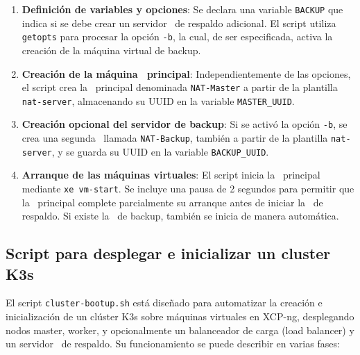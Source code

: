 \begin{enumerate}
    \item \textbf{Definición de variables y opciones}:  
    Se declara una variable \texttt{BACKUP} que indica si se debe crear un servidor \NAT\ de respaldo adicional. El script utiliza \texttt{getopts} para procesar la opción \texttt{-b}, la cual, de ser especificada, activa la creación de la máquina virtual de backup.

    \item \textbf{Creación de la máquina \NAT\ principal}:  
    Independientemente de las opciones, el script crea la \VM\ principal denominada \texttt{NAT-Master} a partir de la plantilla \texttt{nat-server}, almacenando su UUID en la variable \texttt{MASTER\_UUID}.

    \item \textbf{Creación opcional del servidor de backup}:  
    Si se activó la opción \texttt{-b}, se crea una segunda \VM\ llamada \texttt{NAT-Backup}, también a partir de la plantilla \texttt{nat-server}, y se guarda su UUID en la variable \texttt{BACKUP\_UUID}.

    \item \textbf{Arranque de las máquinas virtuales}:  
    El script inicia la \VM\ principal mediante \texttt{xe vm-start}. Se incluye una pausa de 2 segundos para permitir que la \VM\ principal complete parcialmente su arranque antes de iniciar la \VM\ de respaldo. Si existe la \VM\ de backup, también se inicia de manera automática.

\end{enumerate}



\subsection{Script para desplegar e inicializar un cluster K3s}
\noindent
El script \texttt{cluster-bootup.sh} está diseñado para automatizar la creación e inicialización de un clúster K3s sobre máquinas virtuales en XCP-ng, desplegando nodos master, worker, y opcionalmente un balanceador de carga (load balancer) y un servidor \NAT\ de respaldo. Su funcionamiento se puede describir en varias fases:

